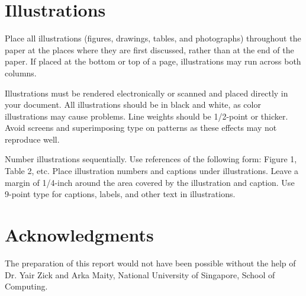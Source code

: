 \documentclass{article}
\begin{document}
\section{Illustrations}

Place all illustrations (figures, drawings, tables, and photographs)
throughout the paper at the places where they are first discussed,
rather than at the end of the paper. If placed at the bottom or top of
a page, illustrations may run across both columns.

Illustrations must be rendered electronically or scanned and placed
directly in your document. All illustrations should be in black and
white, as color illustrations may cause problems. Line weights should
be 1/2-point or thicker. Avoid screens and superimposing type on
patterns as these effects may not reproduce well.

Number illustrations sequentially. Use references of the following
form: Figure 1, Table 2, etc. Place illustration numbers and captions
under illustrations. Leave a margin of 1/4-inch around the area
covered by the illustration and caption.  Use 9-point type for
captions, labels, and other text in illustrations.
\fi

\section*{Acknowledgments}

The preparation of this report would not have been possible without the help of Dr. Yair Zick and Arka Maity, National University of Singapore, School of Computing.

\appendix

\iffalse
\section{\LaTeX{} and Word Style Files}\label{stylefiles}

The \LaTeX{} and Word style files are available on the IJCAI--18
website, {\tt http://www.ijcai-18.org/}.
These style files implement the formatting instructions in this
document.

The \LaTeX{} files are {\tt ijcai18.sty} and {\tt ijcai18.tex}, and
the Bib\TeX{} files are {\tt named.bst} and {\tt ijcai18.bib}. The
\LaTeX{} style file is for version 2e of \LaTeX{}, and the Bib\TeX{}
style file is for version 0.99c of Bib\TeX{} ({\em not} version
0.98i). The {\tt ijcai18.sty} file is the same as the {\tt
ijcai07.sty} file used for IJCAI--07.

The Microsoft Word style file consists of a single file, {\tt
ijcai18.doc}. This template is the same as the one used for
IJCAI--07.

These Microsoft Word and \LaTeX{} files contain the source of the
present document and may serve as a formatting sample.  
\fi



\end{document}
